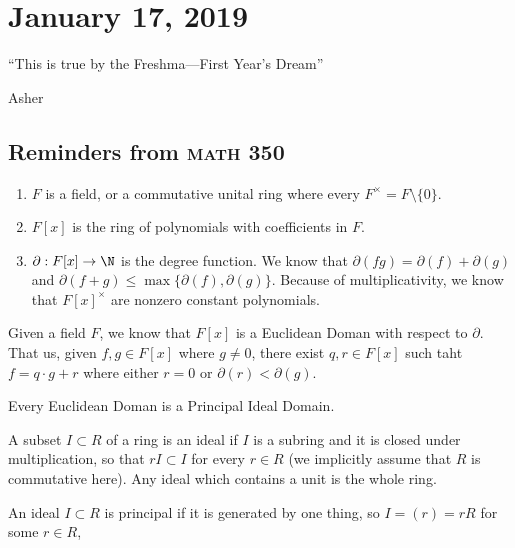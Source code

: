 
\section{January 17, 2019}

\epigraph{``This is true by the Freshma---First Year's Dream''}{Asher}

\subsection{Reminders from \textsc{math} 350}

\begin{enumerate}
\item $F$ is a field, or a commutative unital ring where every $F^\times = F \setminus \{0\}$.
\item $F[x]$ is the ring of polynomials with coefficients in $F$.
\item $\partial : F[x] \to \N$ is the degree function. We know that $\partial(fg) = \partial(f) + \partial(g)$ and $\partial(f+g) \leq \max\{\partial(f), \partial(g)\}$. Because of multiplicativity, we know that $F[x]^\times$ are nonzero constant polynomials.
\end{enumerate}

\begin{theorem}
Given a field $F$, we know that $F[x]$ is a Euclidean Doman with respect to $\partial$. That us, given $f,g \in F[x]$ where $g \not= 0$, there exist $q,r \in F[x]$ such taht $f = q \cdot g + r$ where either $r = 0$ or $\partial(r) < \partial(g)$.
\end{theorem}

\begin{theorem}
Every Euclidean Doman is a Principal Ideal Domain. 
\end{theorem}

\begin{definition}[Ideal]
A subset $I \subset R$ of a ring is an ideal if $I$ is a subring and it is closed under multiplication, so that $rI \subset I$ for every $r \in R$ (we implicitly assume that $R$ is commutative here). Any ideal which contains a unit is the whole ring.
\end{definition}

\begin{definition}
An ideal $I \subset R$ is principal if it is generated by one thing, so $I = (r) = rR$ for some $r \in R$,
\end{definition}

